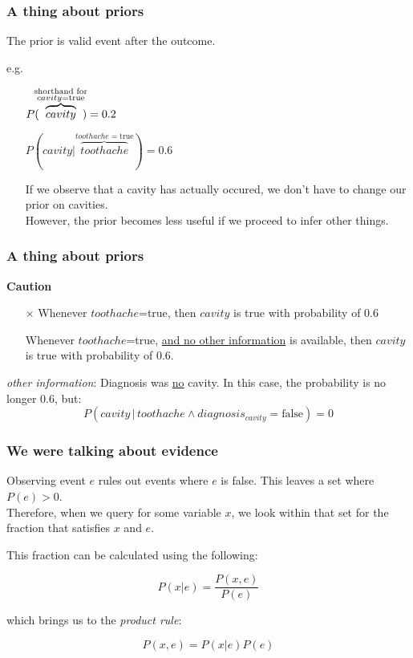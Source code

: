\begin{frame}\frametitle{A thing about priors}

The prior is valid event after the outcome.

e.g.\\
\begin{itemize}
 \item[] $P( \kern-1ex \overbrace{cavity}^{\substack{\text{shorthand for}\\{cavity}=\text{true}}} \kern-1ex) = 0.2$
 \item[] $P(cavity | \overbrace{toothache}^{{toothache}=\text{true}}) = 0.6$
 \item[] If we observe that a cavity has actually occured, we don't have to change our prior on cavities.\\
 However, the prior becomes less useful if we proceed to infer other things.
\end{itemize}


\end{frame}

\begin{frame}\frametitle{A thing about priors}
    
\textbf{Caution}\\
\begin{itemize}
\item[$\times$] Whenever $toothache$=true, then $cavity$ is true with probability of 0.6
\item[\checkmark] Whenever $toothache$=true, \underline{and no other information} is available, then $cavity$ is true with probability of 0.6.
\end{itemize}

\textit{other information}: Diagnosis was \underline{no} cavity. In this case, the probability is no longer 0.6, but:
\begin{equation}
P(cavity \,|\, toothache \wedge diagnosis_{cavity} = \text{false}) = 0
\end{equation}

\end{frame}

\begin{frame}\frametitle{We were talking about evidence}

Observing event $e$ rules out events where $e$ is false. This leaves a set where $P(e)>0$.\\
Therefore, when we query for some variable $x$,
we look within that set for the fraction that satisfies $x$ and $e$.

This fraction can be calculated using the following:

\begin{equation}
P(x|e) = \frac{P(x,e)}{P(e)}
\end{equation}

which brings us to the \emph{product rule}:

\begin{equation}
P(x,e) = P(x|e) P(e)
\label{eq:productrule}    
\end{equation}

\end{frame}

